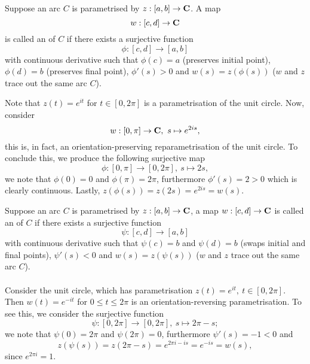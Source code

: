 \vspace*{1em}

\begin{definition}
Suppose an arc $C$ is parametrised by $z:[a,b] \to \mathbf C$. A map
\[w:[c,d] \to \mathbf C\]
is called an  of $C$ if there exists a surjective function
\[\phi:[c,d] \to [a,b]\]
with continuous derivative such that $\phi(c) = a$ (preserves initial point), $\phi(d) = b$ (preserves final point), $\phi'(s) > 0$ and $w(s) = z(\phi(s))$ ($w$ and $z$ trace out the same arc $C$).
\end{definition}


\begin{example}
Note that $z(t) = e^{it}$ for $t \in [0,2\pi]$ is a parametrisation of the unit circle. Now, consider
\[w:[0,\pi] \to \mathbf C,\ s \mapsto e^{2is},\]
this is, in fact, an orientation-preserving reparametrisation of the unit circle. To conclude this, we produce the following surjective map
\[\phi:[0,\pi] \to [0,2\pi],\ s \mapsto 2s,\]
we note that $\phi(0) = 0$ and $\phi(\pi) = 2\pi$, furthermore $\phi'(s) = 2 > 0$ which is clearly continuous. Lastly, $z(\phi(s)) = z(2s) = e^{2is} = w(s)$.
\end{example}

\vspace*{1em}

\begin{remark}
Suppose an arc $C$ is parametrised by $z:[a,b] \to \mathbf C$, a map $w:[c,d] \to \mathbf C$ 
is called an  of $C$ if there exists a surjective function
\[\psi:[c,d] \to [a,b]\]
with continuous derivative such that $\psi(c) = b$ and $\psi(d) = b$ (swaps initial and final points), $\psi'(s) < 0$ and $w(s) = z(\psi(s))$ ($w$ and $z$ trace out the same arc $C$).\\
\\
Consider the unit circle, which has parametrisation $z(t) = e^{it},\ t \in [0,2\pi]$. Then $w(t) = e^{-it}$ for $0 \leq t \leq 2\pi$ is an orientation-reversing parametrisation. To see this, we consider the surjective function
\[\psi:[0,2\pi] \to [0,2\pi],\ s \mapsto 2\pi - s;\]
we note that $\psi(0) = 2\pi$ and $\psi(2\pi) = 0$, furthermore $\psi'(s) = -1 < 0$ and \[z(\psi(s)) = z(2\pi - s) = e^{2\pi i - is} = e^{-is} = w(s),\] since $e^{2\pi i} = 1$.
\end{remark}

